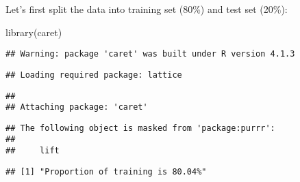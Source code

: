 \documentclass[
]{article}
\newenvironment{Shaded}{\begin{snugshade}}{\end{snugshade}}
\newcommand{\AttributeTok}[1]{\textcolor[rgb]{0.77,0.63,0.00}{#1}}
\newcommand{\CommentTok}[1]{\textcolor[rgb]{0.56,0.35,0.01}{\textit{#1}}}
\newcommand{\ConstantTok}[1]{\textcolor[rgb]{0.00,0.00,0.00}{#1}}
\newcommand{\DecValTok}[1]{\textcolor[rgb]{0.00,0.00,0.81}{#1}}
\newcommand{\FloatTok}[1]{\textcolor[rgb]{0.00,0.00,0.81}{#1}}
\newcommand{\FunctionTok}[1]{\textcolor[rgb]{0.00,0.00,0.00}{#1}}
\newcommand{\NormalTok}[1]{#1}
\newcommand{\OtherTok}[1]{\textcolor[rgb]{0.56,0.35,0.01}{#1}}
\newcommand{\SpecialCharTok}[1]{\textcolor[rgb]{0.00,0.00,0.00}{#1}}
\newcommand{\StringTok}[1]{\textcolor[rgb]{0.31,0.60,0.02}{#1}}
\begin{document}
Let's first split the data into training set (80\%) and test set (20\%):

\begin{Shaded}
\begin{Highlighting}[]
\FunctionTok{library}\NormalTok{(caret)}
\end{Highlighting}
\end{Shaded}

\begin{verbatim}
## Warning: package 'caret' was built under R version 4.1.3
\end{verbatim}

\begin{verbatim}
## Loading required package: lattice
\end{verbatim}

\begin{verbatim}
## 
## Attaching package: 'caret'
\end{verbatim}

\begin{verbatim}
## The following object is masked from 'package:purrr':
## 
##     lift
\end{verbatim}

\begin{Shaded}
\end{Shaded}

\begin{verbatim}
## [1] "Proportion of training is 80.04%"
\end{verbatim}
\end{document}
